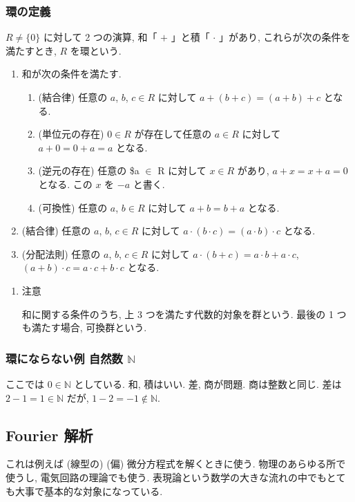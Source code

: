 \documentclass[openany, a4paper, oneside]{jsbook}
\begin{document}
\subsubsection{環の定義}

$R \neq \{0\}$ に対して 2 つの演算, 和「 $+$ 」と積「 $\cdot$ 」があり, これらが次の条件を満たすとき, $R$ を環という.
\begin{enumerate}
\item 和が次の条件を満たす.
\begin{enumerate}
\item (結合律) 任意の $a$, $b$, $c \in R$ に対して $a + (b + c) = (a + b) + c$ となる.
\item (単位元の存在) $0 \in R$ が存在して任意の $a \in R$ に対して $a + 0 = 0 + a = a$ となる.
\item (逆元の存在) 任意の \$a $\in$ R に対して $x \in R$ があり, $a + x = x + a = 0$ となる. この $x$ を $-a$ と書く.
\item (可換性) 任意の $a$, $b \in R$ に対して $a + b = b + a$ となる.
\end{enumerate}
\item (結合律) 任意の $a$, $b$, $c \in R$ に対して $a \cdot (b \cdot c) = (a \cdot b) \cdot c$ となる.
\item (分配法則) 任意の $a$, $b$, $c \in R$ に対して $a \cdot (b + c) = a \cdot b + a \cdot c$, $(a + b) \cdot c = a \cdot c + b \cdot c$ となる.
\end{enumerate}
\begin{enumerate}
\item 注意

和に関する条件のうち, 上 3 つを満たす代数的対象を群という.
最後の 1 つも満たす場合, 可換群という.
\end{enumerate}
\subsubsection{環にならない例 自然数 $\mathbb{N}$}

ここでは $0 \in \mathbb{N}$ としている.
和, 積はいい.
差, 商が問題.
商は整数と同じ.
差は $2 - 1 = 1 \in \mathbb{N}$ だが, $1 - 2 = - 1\notin \mathbb{N}$.
\subsection{Fourier 解析}

これは例えば (線型の) (偏) 微分方程式を解くときに使う.
物理のあらゆる所で使うし, 電気回路の理論でも使う.
表現論という数学の大きな流れの中でもとても大事で基本的な対象になっている.
\end{document}
